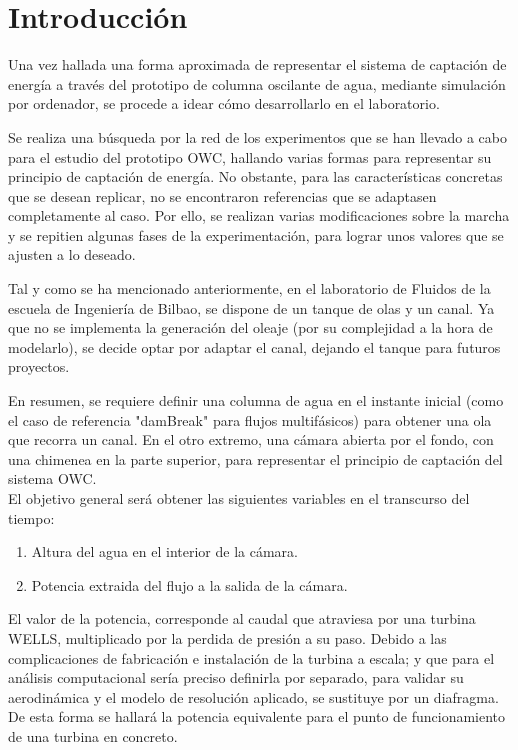 \label{ch:experim}

\section{Introducción}\label{header-n0}

Una vez hallada una forma aproximada de representar el sistema de
captación de energía a través del prototipo de columna oscilante de
agua, mediante simulación por ordenador, se procede a idear cómo
desarrollarlo en el laboratorio.

Se realiza una búsqueda por la red de los experimentos que se han
llevado a cabo para el estudio del prototipo OWC, hallando varias formas
para representar su principio de captación de energía. No obstante, para
las características concretas que se desean replicar, no se encontraron
referencias que se adaptasen completamente al caso. Por ello, se
realizan varias modificaciones sobre la marcha y se repitien algunas
fases de la experimentación, para lograr unos valores que se ajusten a
lo deseado.

Tal y como se ha mencionado anteriormente, en el laboratorio de Fluidos
de la escuela de Ingeniería de Bilbao, se dispone de un tanque de olas y
un canal. Ya que no se implementa la generación del oleaje (por su
complejidad a la hora de modelarlo), se decide optar por adaptar el
canal, dejando el tanque para futuros proyectos.

En resumen, se requiere definir una columna de agua en el instante
inicial (como el caso de referencia "damBreak" para flujos multifásicos)
para obtener una ola que recorra un canal. En el otro extremo, una
cámara abierta por el fondo, con una chimenea en la parte superior, para
representar el principio de captación del sistema OWC.\\

El objetivo general será obtener las siguientes variables en el
transcurso del tiempo:

\begin{enumerate}
\def\labelenumi{\arabic{enumi}.}
\item
  Altura del agua en el interior de la cámara.
\item
  Potencia extraida del flujo a la salida de la cámara.
\end{enumerate}

El valor de la potencia, corresponde al caudal que atraviesa por una
turbina WELLS, multiplicado por la perdida de presión a su paso. Debido
a las complicaciones de fabricación e instalación de la turbina a
escala; y que para el análisis computacional sería preciso definirla por
separado, para validar su aerodinámica y el modelo de resolución
aplicado, se sustituye por un diafragma. De esta forma se hallará la
potencia equivalente para el punto de funcionamiento de una turbina en
concreto.

